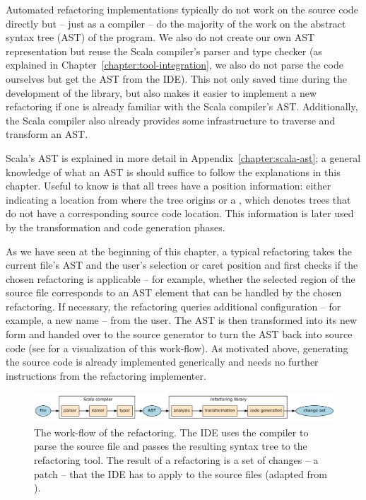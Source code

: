 Automated refactoring implementations typically do not work on the source code directly but -- just as a compiler -- do the majority of the work on the abstract syntax tree (AST) of the program. We also do not create our own AST representation but reuse the Scala compiler's parser and type checker (as explained in Chapter~\ref{chapter:tool-integration}, we also do not parse the code ourselves but get the AST from the IDE). This not only saved time during the development of the library, but also makes it easier to implement a new refactoring if one is already familiar with the Scala compiler's AST. Additionally, the Scala compiler also already provides some infrastructure to traverse and transform an AST.

Scala's AST is explained in more detail in Appendix~\vref{chapter:scala-ast}; a general knowledge of what an AST is should suffice to follow the explanations in this chapter. Useful to know is that all trees have a position information: either indicating a location from where the tree origins or a , which denotes trees that do not have a corresponding source code location. This information is later used by the transformation and code generation phases.

As we have seen at the beginning of this chapter, a typical refactoring takes the current file's AST and the user's selection or caret position and first checks if the chosen refactoring is applicable -- for example, whether the selected region of the source file corresponds to an AST element that can be handled by the chosen refactoring. If necessary, the refactoring queries additional configuration -- for example, a new name -- from the user. The AST is then transformed into its new form and handed over to the source generator to turn the AST back into source code (see  for a visualization of this work-flow). As motivated above, generating the source code is already implemented generically and needs no further instructions from the refactoring implementer. %

\begin{figure}
  \centering
  \includegraphics[width=\linewidth]{refactoring-flow.pdf}
  \caption{The work-flow of the refactoring. The IDE uses the compiler to parse the source file and passes the resulting syntax tree to the refactoring tool. The result of a refactoring is a set of changes -- a patch -- that the IDE has to apply to the source files (adapted from \cite{ScalaRefactoring}).}
  \label{figure:refactoring-flow}
\end{figure}

